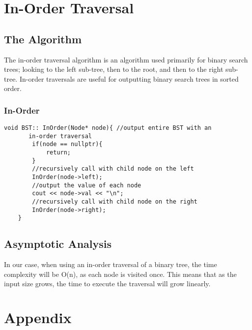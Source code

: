 \documentclass[letterpaper, 10pt,DIV=13]{scrartcl}
\numberwithin{equation}{section} %
\numberwithin{figure}{section} %
\numberwithin{table}{section} %
\begin{document}
\section{In-Order Traversal}

\subsection{The Algorithm}
The in-order traversal algorithm is an algorithm used primarily for binary search trees; looking to the left sub-tree, then to the root, and then to the right sub-tree. In-order traversals are useful for outputting binary search trees in sorted order.

\subsubsection*{In-Order}
    \lstset{numbers=left, numberstyle=\tiny, stepnumber=1, numbersep=5pt, basicstyle=\footnotesize\ttfamily}
    \begin{lstlisting}[frame=single, ]
       void BST:: InOrder(Node* node){ //output entire BST with an 
       in-order traversal
        if(node == nullptr){
            return;
        }
        //recursively call with child node on the left
        InOrder(node->left);
        //output the value of each node
        cout << node->val << "\n";
        //recursively call with child node on the right
        InOrder(node->right);
    }

\end{lstlisting}

\subsection{Asymptotic Analysis}
In our case, when using an in-order traversal of a binary tree, the time complexity will be O(n), as each node is visited once. This means that as the input size grows, the time to execute the traversal will grow linearly.

\pagebreak

\section{Appendix}
\end{document}
